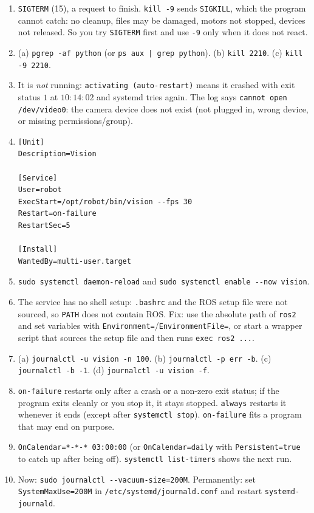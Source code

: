 \begin{enumerate}[label=\textbf{\ansnum.\arabic*}]
  \item \texttt{SIGTERM} (15), a request to finish. \texttt{kill -9} sends \texttt{SIGKILL}, which the program cannot catch: no cleanup, files may be damaged, motors not stopped, devices not released. So you try \texttt{SIGTERM} first and use \texttt{-9} only when it does not react.
  \item (a) \verb|pgrep -af python| (or \verb!ps aux | grep python!). (b) \verb|kill 2210|. (c) \verb|kill -9 2210|.
  \item It is \emph{not} running: \texttt{activating (auto-restart)} means it crashed with exit status $1$ at $10{:}14{:}02$ and systemd tries again. The log says \texttt{cannot open /dev/video0}: the camera device does not exist (not plugged in, wrong device, or missing permissions/group).
  \item \begin{verbatim}
[Unit]
Description=Vision

[Service]
User=robot
ExecStart=/opt/robot/bin/vision --fps 30
Restart=on-failure
RestartSec=5

[Install]
WantedBy=multi-user.target
\end{verbatim}
  \item \verb|sudo systemctl daemon-reload| and \verb|sudo systemctl enable --now vision|.
  \item The service has no shell setup: \texttt{.bashrc} and the ROS setup file were not sourced, so \texttt{PATH} does not contain ROS. Fix: use the absolute path of \texttt{ros2} and set variables with \texttt{Environment=}/\texttt{EnvironmentFile=}, or start a wrapper script that sources the setup file and then runs \texttt{exec ros2 ...}.
  \item (a) \verb|journalctl -u vision -n 100|. (b) \verb|journalctl -p err -b|. (c) \verb|journalctl -b -1|. (d) \verb|journalctl -u vision -f|.
  \item \texttt{on-failure} restarts only after a crash or a non-zero exit status; if the program exits cleanly or you stop it, it stays stopped. \texttt{always} restarts it whenever it ends (except after \texttt{systemctl stop}). \texttt{on-failure} fits a program that may end on purpose.
  \item \verb|OnCalendar=*-*-* 03:00:00| (or \verb|OnCalendar=daily| with \texttt{Persistent=true} to catch up after being off). \verb|systemctl list-timers| shows the next run.
  \item Now: \verb|sudo journalctl --vacuum-size=200M|. Permanently: set \texttt{SystemMaxUse=200M} in \texttt{/etc/systemd/journald.conf} and restart \texttt{systemd-journald}.
\end{enumerate}
